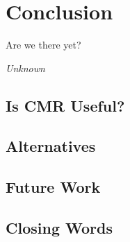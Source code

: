 \chapter{Conclusion}
\epigraph{Are we there yet?}{\textit{Unknown}}
\lorem{}

\clearpage

\section{Is CMR Useful?}
\lorem{}

\section{Alternatives}
\lorem{}

\section{Future Work}
\lorem{}

\section{Closing Words}
\lorem{}
